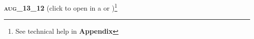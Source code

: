 \documentclass{article}
\begin{document}
\begin{adjustwidth}{-1cm}{}
{\noindent \large \bf \textsc{aug\_13\_12}} \hspace{0.2cm} (click to open in a \href{run:light\_summary.xls}{\color{blue} } or \href{run:light\_summary.txt}{\color{blue} })\footnote{See technical help in {\bf Appendix}}
\end{adjustwidth}


\newpage
\null
\newpage

\end{document}
